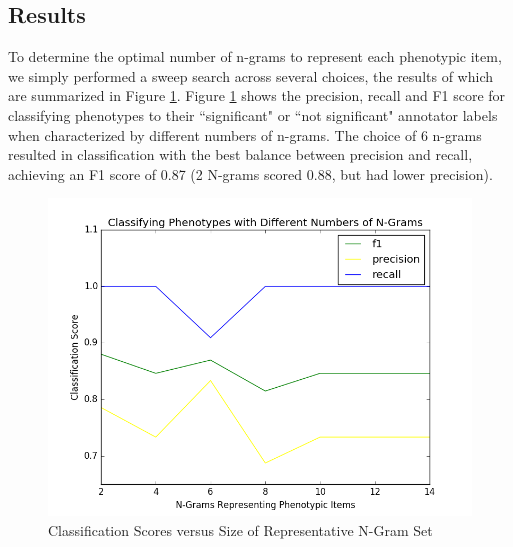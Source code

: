 \documentclass{sig-alternate-05-2015}
\begin{document}

\subsection{Results}
To determine the optimal number of n-grams to represent each phenotypic item, we simply performed a sweep search across several choices, the results of which are summarized in Figure \ref{fig:classificationVarNG}.
Figure \ref{fig:classificationVarNG} shows the precision, recall and F1 score for classifying phenotypes to their ``significant" or ``not significant" annotator labels when characterized by different numbers of n-grams. 
The choice of 6 n-grams resulted in classification with the best balance between precision and recall, achieving an F1 score of 0.87 (2 N-grams scored 0.88, but had lower precision).

\begin{figure} [t]
\centering
\includegraphics[width=\linewidth] {classificationWithVariableNG.png}
\caption{Classification Scores versus Size of Representative N-Gram Set}
\label{fig:classificationVarNG}
\end{figure}
\end{document}
